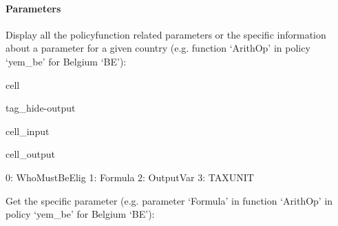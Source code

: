 \documentclass[letterpaper,10pt,english]{sphinxmanual}
\begin{document}
\paragraph{Parameters}
\label{\detokenize{notebooks/userguide:parameters}}
\sphinxAtStartPar
Display all the policy\sphinxhyphen{}function related parameters or the specific information about a parameter for a given country (e.g. function ‘ArithOp’ in policy ‘yem\_be’ for Belgium ‘BE’):

\begin{sphinxuseclass}{cell}
\begin{sphinxuseclass}{tag_hide-output}
\begin{sphinxuseclass}{cell_input}
\begin{sphinxVerbatim}[commandchars=\\\{\}]
\PYG{p}{[}\PYG{p}{]}\PYG{p}{[}\PYG{p}{]}\PYG{p}{[}\PYG{p}{]}
\end{sphinxVerbatim}

\end{sphinxuseclass}
\begin{sphinxuseclass}{cell_output}
\begin{sphinxVerbatim}[commandchars=\\\{\}]
0: Who\PYGZus{}Must\PYGZus{}Be\PYGZus{}Elig
1: Formula         
2: Output\PYGZus{}Var      
3: TAX\PYGZus{}UNIT        
\end{sphinxVerbatim}

\end{sphinxuseclass}
\end{sphinxuseclass}
\end{sphinxuseclass}
\sphinxAtStartPar
Get the specific parameter (e.g. parameter ‘Formula’ in function ‘ArithOp’ in policy ‘yem\_be’ for Belgium ‘BE’):
\end{document}
